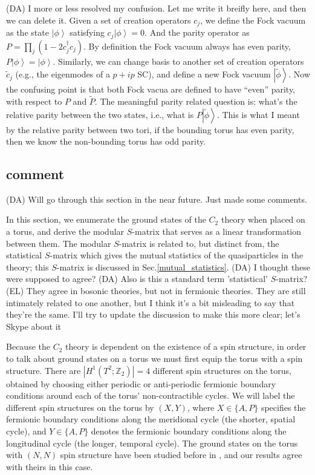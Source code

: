 \documentclass[12pt,a4paper]{article}
\newcommand{\zt}{\mathbb{Z}_2}
\newcommand{\ket}[1]{\ensuremath{\left|#1\right\rangle}}
\newcommand{\dave}[1]{{\color{ao(english)}\footnotesize{(DA) #1}}}
\newcommand{\ethan}[1]{{\color{amethyst}\footnotesize{(EL) #1}}}
\begin{document}
\dave{I more or less resolved my confusion. Let me write it breifly here, and then we can delete it. 
Given a set of creation operators $c_j$, we define the Fock vacuum as the state $\ket{\phi}$ satisfying $c_j \ket{\phi} = 0$.
And the parity operator as $P = \prod_j (1-2 c_j^\dagger c_j)$. 
By definition the Fock vacuum always has even parity, $P \ket{\phi} = \ket{\phi}$.
Similarly, we can change basis to another set of creation operators  $\tilde{c}_j$ 
(e.g., the eigenmodes of a $p+ip$ SC), and define a new Fock vacuum $\ket{\tilde \phi}$. 
Now the confusing point is that both Fock vacua are defined to have ``even'' parity, with 
respect to $P$ and $\tilde{P}$.
The meaningful parity related question is: what's the relative parity between the two states, 
i.e., what is $P \ket{\tilde{\phi}}$.
This is what I meant by the relative parity between two tori, if the bounding torus has even parity, 
then we know the non-bounding torus has odd parity.
}
 
 

 
\subsection{comment}
\dave{Will go through this section in the near future. 
Just made some comments.}

In this section, we enumerate the ground states of the $C_2$ theory when placed on a torus, 
and derive the modular $S$-matrix that serves as a linear transformation between them. 
The modular $S$-matrix is related to, but distinct from, the statistical $S$-matrix which 
gives the mutual statistics of the quasiparticles in the theory; this $S$-matrix is discussed 
in Sec.\ref{mutual_statistics}. 
\dave{I thought these were supposed to agree?}
\dave{Also is this a standard term 'statistical' $S$-matrix?}
\ethan{They agree in bosonic theories, but not in fermionic theories. They are still intimately 
related to one another, but I think it's a bit misleading to say that they're the same. 
I'll try to update the discussion to make this more clear; let's Skype about it}

Because the $C_2$ theory is dependent on the existence of a spin structure, in order to talk about 
ground states on a torus we must first equip the torus with a spin structure. 
There are $|H^1(T^2;\zt)|=4$ different spin structures on the torus, obtained by choosing either 
periodic or anti-periodic fermionic boundary conditions around each of the torus' non-contractible cycles. 
We will label the different spin structures on the torus by $(X,Y)$, where $X \in \{A,P\}$ specifies the 
fermionic boundary conditions along the meridional cycle (the shorter, spatial cycle), and $Y \in \{A,P\}$ 
denotes the fermionic boundary conditions along the longitudinal cycle (the longer, temporal cycle). 
The ground states on the torus with $(N,N)$ spin structure have been studied before in \cite{ware2016}, 
and our results agree with theirs in this case. 
\end{document}
